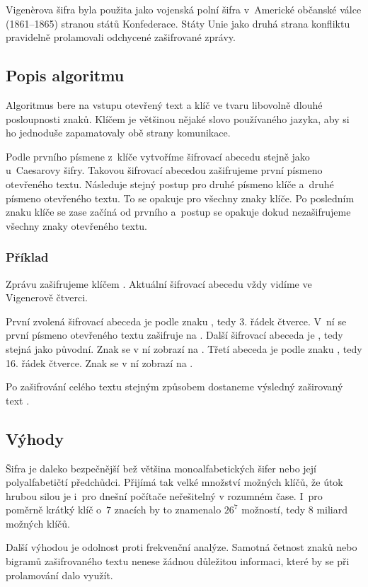 \documentclass[glossaries, index]{kidiplom}
\begin{document}
Vigenèrova šifra byla použita jako vojenská polní šifra v~Americké občanské válce (1861--1865) stranou států Konfederace. Státy Unie jako druhá strana konfliktu pravidelně prolamovali odchycené zašifrované zprávy.

\subsection{Popis algoritmu}
Algoritmus bere na vstupu otevřený text a klíč ve tvaru libovolně dlouhé posloupnosti znaků. Klíčem je většinou nějaké slovo používaného jazyka, aby si ho jednoduše zapamatovaly obě strany komunikace.

Podle prvního písmene z~klíče vytvoříme šifrovací abecedu stejně jako u~Caesarovy šifry. Takovou šifrovací abecedou zašifrujeme první písmeno otevřeného textu. Následuje stejný postup pro druhé písmeno klíče a~druhé písmeno otevřeného textu. To se opakuje pro všechny znaky klíče. Po posledním znaku klíče se zase začíná od prvního a~postup se opakuje dokud nezašifrujeme všechny znaky otevřeného textu.

\subsubsection{Příklad}
Zprávu  zašifrujeme klíčem . Aktuální šifrovací abecedu vždy vidíme ve Vigenerově čtverci. 

První zvolená šifrovací abeceda je podle znaku , tedy 3. řádek čtverce. V~ní se první písmeno otevřeného textu  zašifruje na . Další šifrovací abeceda je , tedy stejná jako původní. Znak  se v ní zobrazí na . Třetí abeceda je podle znaku , tedy 16. řádek čtverce. Znak  se v ní zobrazí na . 

Po zašifrování celého textu stejným způsobem dostaneme výsledný zaširovaný text .

\subsection{Výhody}
Šifra je daleko bezpečnější bež většina monoalfabetických šifer nebo její polyalfabetičtí předchůdci. Přijímá tak velké množství možných klíčů, že útok hrubou silou je i~pro dnešní počítače neřešitelný v rozumném čase. I~pro poměrně krátký klíč o~$7$ znacích by to znamenalo $26^7$ možností, tedy $8$ miliard možných klíčů.

Další výhodou je odolnost proti frekvenční analýze. Samotná četnost znaků nebo bigramů zašifrovaného textu nenese žádnou důležitou informaci, které by se při prolamování dalo využít.
\end{document}
